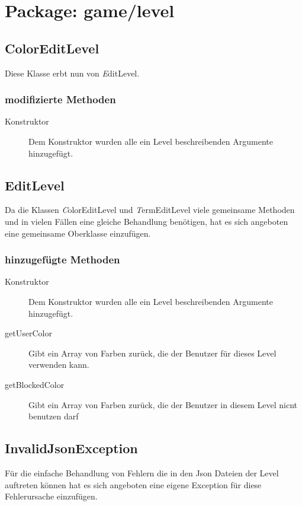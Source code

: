 \section{Package: game/level}

\subsection{ColorEditLevel}
	Diese Klasse erbt nun von \emph EditLevel.

	\subsubsection{modifizierte Methoden}
		\begin{description}
			\item[Konstruktor] Dem Konstruktor wurden alle ein Level beschreibenden Argumente hinzugefügt.
		\end{description}


\subsection{EditLevel}
	Da die Klassen \emph ColorEditLevel und \emph TermEditLevel viele gemeinsame Methoden und in vielen Fällen eine 
	gleiche Behandlung benötigen, hat es sich angeboten eine gemeinsame Oberklasse einzufügen. 

	\subsubsection{hinzugefügte Methoden}
		\begin{description}
			\item[Konstruktor] Dem Konstruktor wurden alle ein Level beschreibenden Argumente hinzugefügt.
			\item[getUserColor] Gibt ein Array von Farben zurück, die der Benutzer für dieses Level verwenden kann.
			\item[getBlockedColor] Gibt ein Array von Farben zurück, die der Benutzer in diesem Level nicnt benutzen 
				darf
		\end{description}


\subsection{InvalidJsonException}
	Für die einfache Behandlung von Fehlern die in den Json Dateien der Level auftreten können hat es sich angeboten
	eine eigene Exception für diese Fehlerursache einzufügen.   

